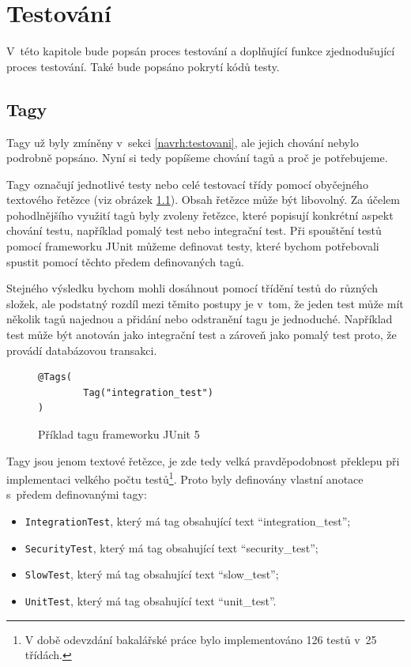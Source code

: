 \chapter{Testování}\label{chapter:testovani}
V~této kapitole bude popsán proces testování a doplňující funkce zjednodušující proces testování. Také bude popsáno pokrytí kódů testy.

\section{Tagy}\label{testovani:tagy}
    Tagy už byly zmíněny v~sekci \ref{navrh:testovani}, ale jejich chování nebylo podrobně popsáno. Nyní si tedy popíšeme chování tagů a proč je potřebujeme. 
    
    Tagy označují jednotlivé testy nebo celé testovací třídy pomocí obyčejného textového řetězce (viz obrázek \ref{code:tag-junit-5}). Obsah řetězce může být libovolný. Za účelem pohodlnějšího využití tagů byly zvoleny řetězce, které popisují konkrétní aspekt chování testu, například pomalý test nebo integrační test. Při spouštění testů pomocí frameworku JUnit můžeme definovat testy, které bychom potřebovali spustit pomocí těchto předem definovaných tagů.
    
    Stejného výsledku bychom mohli dosáhnout pomocí třídění testů do různých složek, ale podstatný rozdíl mezi těmito postupy je v~tom, že jeden test může mít několik tagů najednou a přidání nebo odstranění tagu je jednoduché. Například test může být anotován jako integrační test a zároveň jako pomalý test proto, že provádí databázovou transakci.
    \begin{figure}
        \begin{verbatim}
@Tags(
        Tag("integration_test")
)
        \end{verbatim}
        \caption{Příklad tagu frameworku JUnit 5} 
        \label{code:tag-junit-5}
    \end{figure}
    
    Tagy jsou jenom textové řetězce, je zde tedy velká pravděpodobnost překlepu při implementaci velkého počtu testů\footnote{V době odevzdání bakalářské práce bylo implementováno 126 testů v~25 třídách.}. Proto byly definovány vlastní anotace s~předem definovanými tagy:
    \begin{itemize}
            \item \verb|IntegrationTest|, který má tag obsahující text \enquote{integration\_test};
            \item \verb|SecurityTest|, který má tag obsahující text \enquote{security\_test};
            \item \verb|SlowTest|, který má tag obsahující text \enquote{slow\_test};
            \item \verb|UnitTest|, který má tag obsahující text \enquote{unit\_test}.
    \end{itemize}
    

